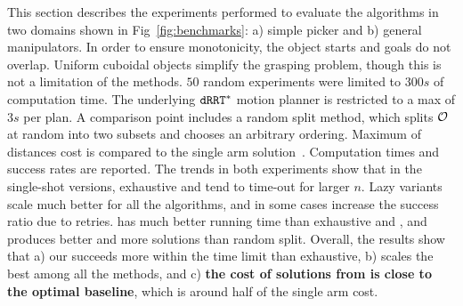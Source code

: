 This section describes the experiments performed to evaluate the algorithms in two  domains shown in Fig~\ref{fig:benchmarks}: a) simple picker and b) general manipulators.
In order to ensure monotonicity, the object starts and goals do not overlap. Uniform cuboidal objects simplify the grasping problem, though this is not a limitation of the methods. $ 50 $ random experiments were limited to $300s$ of computation time. The underlying $ {\tt dRRT^*} $ motion planner is restricted to a max of $ 3s $ per plan.
A comparison point includes a random split method, which splits $ \mathcal{O} $ at random into two subsets and chooses an arbitrary ordering. Maximum of distances cost is compared to the single arm solution~\cite{193}. Computation times and success rates are reported. The trends in both experiments show that in the single-shot versions, exhaustive and \milp tend to time-out for larger $n$. Lazy variants scale much better for all the algorithms, and in some cases increase the success ratio due to retries. \algo has much better running time than exhaustive and \milp, and produces better and more solutions than random split. Overall, the results show that a) our \milp succeeds more within the time limit than exhaustive, b) \algo scales the best among all the methods, and c) \textbf{the cost of solutions from \algo is close to the optimal baseline}, which is around half of the single arm cost.



